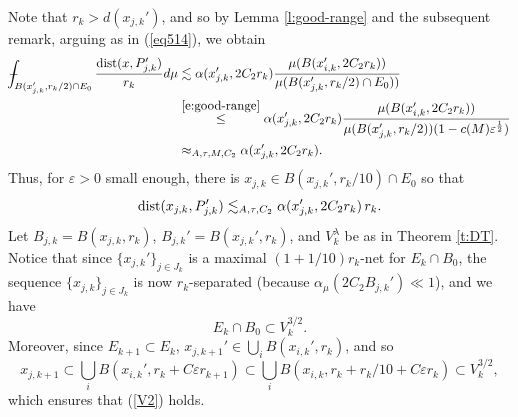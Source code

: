 \documentclass[11pt]{amsart}
\newcommand{\dist}{{\rm dist}}
\newcommand{\rf}[1]{{(\ref{#1})}}
\newcommand{\ve}{{\varepsilon}}
\def\Xint#1{\mathchoice
{\XXint\displaystyle\textstyle{#1}}%
{\XXint\textstyle\scriptstyle{#1}}%
{\XXint\scriptstyle\scriptscriptstyle{#1}}%
{\XXint\scriptscriptstyle\scriptscriptstyle{#1}}%
\!\int}
\def\XXint#1#2#3{{\setbox0=\hbox{$#1{#2#3}{\int}$ }
\vcenter{\hbox{$#2#3$ }}\kern-.58\wd0}}
\def\avint{\Xint-}
\theoremstyle{definition}
\theoremstyle{remark}
\numberwithin{equation}{section}
\def\lec{\lesssim}
\def\lec{\lesssim}
\begin{document}
Note that $r_{k}>d(x_{j,k}')$, and so by Lemma \ref{l:good-range} and the subsequent remark, arguing as in
\rf{eq514}, we obtain
\begin{align*}
\avint_{B(x_{j,k}', r_{k}/2)\cap E_{0}}\frac{\dist(x,P_{j,k}')}{r_{k}}d\mu
& \lec \alpha(x_{j,k}',2C_{2}r_{k})\frac{\mu(B(x_{i,k}',2C_{2} r_{k}))}{\mu(B(x_{j,k}', r_{k}/2)\cap E_{0}))}\\
& \stackrel{\eqref{e:good-range}}{\leq} \alpha(x_{j,k}',2C_{2}r_{k}) \frac{\mu(B(x_{i,k}',2C_{2} r_{k}))}{\mu(B(x_{j,k}',r_{k}/2))(1- c(M)\ve^{\frac{1}{2}})}\\
&\approx_{A,\tau,M, C_2} \alpha(x_{j,k}',2C_{2}r_{k}).
\end{align*}
Thus, for $\ve>0$ small enough, there is $x_{j,k}\in B(x_{j,k}',r_{k}/10)\cap E_{0}$ so that 
\begin{equation}\label{e:xP'}
\dist(x_{j,k},P_{j,k}')\lec_{A,\tau, C_2}  \alpha(x_{j,k}',2C_{2}r_{k}) \,r_{k}.
\end{equation}
Let $B_{j,k} = B(x_{j,k},r_{k})$, $B_{j,k}'=B(x_{j,k}',r_{k})$, and $V_{k}^{\lambda}$ be as in Theorem \ref{t:DT}. Notice that since $\{x_{j,k}'\}_{j\in J_{k}}$ is a maximal $(1+1/10)r_{k}$-net for $E_{k}\cap B_{0}$, the sequence $\{x_{j,k}\}_{j\in J_{k}}$ is now $r_{k}$-separated (because $\alpha_{\mu}(2C_{2}B_{j,k}')\ll1$), and we have 
\begin{equation}
\label{e:E<V}
E_{k}\cap B_{0} \subset V_{k}^{3/2}.  
\end{equation}
Moreover, since $E_{k+1}\subset E_{k}$, $x_{j,k+1}'\in \bigcup_{i} B(x_{i,k}',r_{k})$, and so
\begin{equation}\label{e:E<V-1}
x_{j,k+1}\subset \bigcup_{i} B(x_{i,k}',r_{k}+C\ve r_{k+1})\subset \bigcup_{i} B(x_{i,k},r_{k}+r_{k}/10+C\ve r_{k})\subset V_{k}^{3/2},
\end{equation}
which ensures that \rf{V2} holds.
\end{document}
